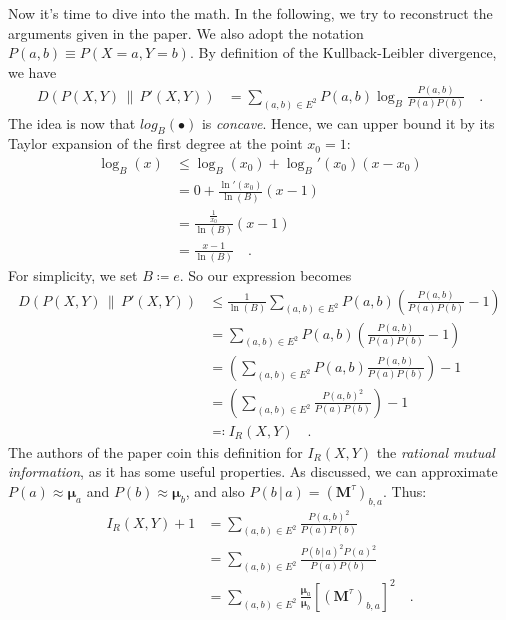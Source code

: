 \documentclass[../../main.tex]{subfiles}
\begin{document}
    \bigskip \bigskip \noindent
    Now it's time to dive into the math. In the following, we try to reconstruct the arguments given in the paper. We also adopt the notation $P (a, b) \equiv P (X = a, Y = b)$. By definition of the Kullback-Leibler divergence, we have
    \begin{align*}
        D(P(X, Y) \,\|\, P'(X, Y)) &= \sum_{(a,b) \in E^2} P(a, b) \log_B \frac{P(a, b)}{P(a) P(b)} \quad .
    \end{align*}
    The idea is now that $log_B(\bullet)$ is \emph{concave}. Hence, we can upper bound it by its Taylor expansion of the first degree at the point $x_0 = 1$:
    \begin{align*}
        \log_B(x) &\leq \log_B(x_0) + \log_B'(x_0) (x - x_0) \\
        &= 0 + \frac{\ln'(x_0)}{\ln(B)} (x - 1) \\
        &= \frac{\frac{1}{x_0}}{\ln(B)} (x - 1) \\
        &= \frac{x - 1}{\ln(B)} \quad .
    \end{align*}
    For simplicity, we set $B \coloneqq e$. So our expression becomes
    \begin{align*}
        D(P(X, Y) \,\|\, P'(X, Y)) &\leq \frac{1}{\ln(B)}\sum_{(a,b) \in E^2} P(a, b) \left( \frac{P(a, b)}{P(a) P(b)} - 1 \right) \\
        &= \sum_{(a,b) \in E^2} P(a, b) \left( \frac{P(a, b)}{P(a) P(b)} - 1 \right) \\
        &= \left( \sum_{(a,b) \in E^2} P(a, b) \frac{P(a, b)}{P(a) P(b)} \right) - 1 \\
        &= \left( \sum_{(a,b) \in E^2} \frac{P(a, b)^2}{P(a) P(b)} \right) - 1 \\
        &\eqqcolon I_R(X, Y) \quad .
    \end{align*}
    The authors of the paper coin this definition for $I_R(X, Y)$ the \emph{rational mutual information}, as it has some useful properties. As discussed, we can approximate $P(a) \approx \boldsymbol{\mu}_a$ and $P(b) \approx \boldsymbol{\mu}_b$, and also $P(b \,|\, a) = (\boldsymbol{M}^{\tau})_{b,a}$. Thus:
    \begin{align*}
        I_R(X, Y) + 1 &= \sum_{(a,b) \in E^2} \frac{P(a, b)^2}{P(a) P(b)} \\
        &= \sum_{(a,b) \in E^2} \frac{P(b \,|\, a)^2 P(a)^2}{P(a) P(b)} \\
        &= \sum_{(a,b) \in E^2} \frac{\boldsymbol{\mu}_a}{\boldsymbol{\mu}_b} \left[ (\boldsymbol{M}^{\tau})_{b,a} \right] ^2 \quad .
    \end{align*}
\end{document}
